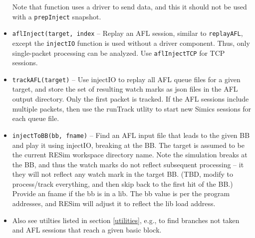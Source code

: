 \documentclass[titlepage]{article}
\begin{document}
\begin{itemize}
Note that function uses a driver to send data, and this it should not be used with a {\tt prepInject} snapshot.

\item{\tt aflInject(target, index} -- Replay an AFL session, similar to {\tt replayAFL}, except the {\tt injectIO} function is used without
a driver component.  Thus, only single-packet processing can be analyzed.  Use {\tt aflInjectTCP} for TCP sessions.

\item{\tt trackAFL(target)} -- Use injectIO to replay all AFL queue files for a given target, and store the set of resulting watch marks as json files
in the AFL output directory.  Only the first packet is tracked.  If the AFL sessions include multiple packets, then use the runTrack utlity to 
start new Simics sessions for each queue file.

\item{\tt injectToBB(bb, fname)} -- Find an AFL input file that leads to the given BB and play it using injectIO, breaking at the BB.  The target
is assumed to be the current RESim workspace directory name.  Note the simulation breaks at the BB, and thus the watch marks do not reflect subsequent
processing -- it they will not reflect any watch mark in the target BB. (TBD, modify to process/track everything, and then skip back to the first hit of the BB.)
Provide an fname if the bb is in a lib.  The bb value is per the program addresses, and RESim will adjust it to reflect the lib load address.

\item Also see utilties listed in section \ref{utilities}, e.g., to find branches not taken and AFL sessions that reach a given basic block.

\end{itemize}
\end{document}
